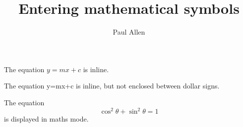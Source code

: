 \documentclass{article}
\author{Paul Allen}
\date{}
\title{Entering mathematical symbols}
\begin{document}
\maketitle

The equation $y=mx+c$ is inline.

The equation y=mx+c is inline, but not enclosed between dollar signs.

The equation \[ \cos^2 \theta + \sin^2 \theta = 1 \] is displayed in maths mode.
\end{document}
